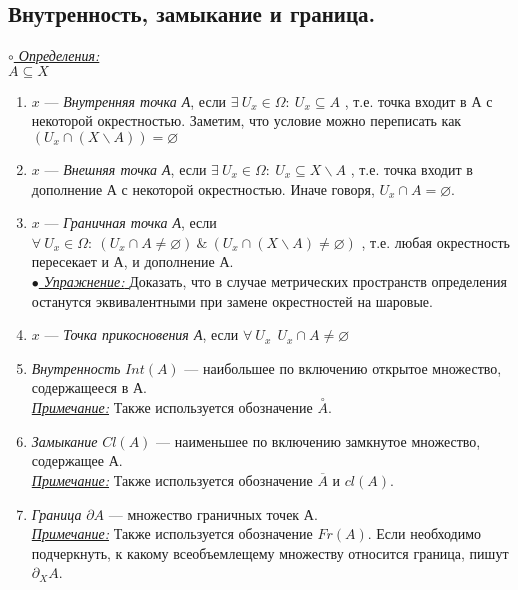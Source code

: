 \documentclass{article}
\begin{document}
\begin{spacing}{1.5}
\section{Внутренность, замыкание и граница.}
\underline{\textit{$\circ$ Определения:}}\\
$A\subseteq X$
\begin{enumerate}
\item $x$ --- \emph{Внутренняя точка А}, если $\exists ~U_{x}\in\Omega:~U_{x}\subseteq A$ , т.е. точка входит в А с некоторой окрестностью. Заметим, что условие можно переписать как $(U_{x}\cap(X\backslash A))=\varnothing$
\item $x$ --- \emph{Внешняя точка А}, если $\exists ~U_{x}\in\Omega:~U_{x}\subseteq X\backslash A$ , т.е. точка входит в дополнение А с некоторой окрестностью. Иначе говоря, $U_{x}\cap A=\varnothing$.
\item $x$ --- \emph{Граничная точка А}, если $\forall ~U_{x}\in\Omega:~(U_{x}\cap A\neq\varnothing) ~\& ~ (U_{x}\cap(X\backslash A)\neq\varnothing)$ , т.е. любая окрестность пересекает и А, и дополнение А.
\\ \underline{\emph{$\bullet$ Упражнение: }} Доказать, что в случае метрических пространств определения останутся эквивалентными при замене окрестностей на шаровые.
\item $x$ --- \emph{Точка прикосновения А}, если $\forall~U_{x}~~U_{x}\cap A\neq \varnothing$
\item \emph{Внутренность} $Int(A)$ --- наибольшее по включению открытое множество, содержащееся в А.
\\ \underline{\emph{Примечание:}} Также используется обозначение $\overset{\circ}{A}$.
\item \emph{Замыкание} $Cl(A)$ --- наименьшее по включению замкнутое множество, содержащее А.
\\ \underline{\emph{Примечание:}} Также используется обозначение $\overline{A}$ и $cl(A)$.
\item \emph{Граница} $\partial A$ --- множество граничных точек А. 
\\ \underline{\emph{Примечание:}} Также используется обозначение $Fr(A)$. Если необходимо подчеркнуть, к какому всеобъемлещему множеству относится граница, пишут $\partial_{X}A$.
\end{enumerate}

\end{spacing}
\end{document}
